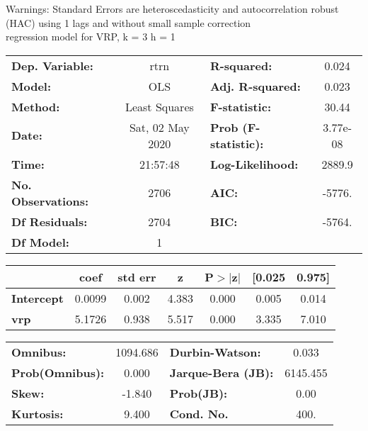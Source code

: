 Warnings: \newline
 [1] Standard Errors are heteroscedasticity and autocorrelation robust (HAC) using 1 lags and without small sample correction\\ 

regression model for VRP, k = 3 h = 1\begin{center}
\begin{tabular}{lclc}
\toprule
\textbf{Dep. Variable:}    &       rtrn       & \textbf{  R-squared:         } &     0.024   \\
\textbf{Model:}            &       OLS        & \textbf{  Adj. R-squared:    } &     0.023   \\
\textbf{Method:}           &  Least Squares   & \textbf{  F-statistic:       } &     30.44   \\
\textbf{Date:}             & Sat, 02 May 2020 & \textbf{  Prob (F-statistic):} &  3.77e-08   \\
\textbf{Time:}             &     21:57:48     & \textbf{  Log-Likelihood:    } &    2889.9   \\
\textbf{No. Observations:} &        2706      & \textbf{  AIC:               } &    -5776.   \\
\textbf{Df Residuals:}     &        2704      & \textbf{  BIC:               } &    -5764.   \\
\textbf{Df Model:}         &           1      & \textbf{                     } &             \\
\bottomrule
\end{tabular}
\begin{tabular}{lcccccc}
                   & \textbf{coef} & \textbf{std err} & \textbf{z} & \textbf{P$> |$z$|$} & \textbf{[0.025} & \textbf{0.975]}  \\
\midrule
\textbf{Intercept} &       0.0099  &        0.002     &     4.383  &         0.000        &        0.005    &        0.014     \\
\textbf{vrp}       &       5.1726  &        0.938     &     5.517  &         0.000        &        3.335    &        7.010     \\
\bottomrule
\end{tabular}
\begin{tabular}{lclc}
\textbf{Omnibus:}       & 1094.686 & \textbf{  Durbin-Watson:     } &    0.033  \\
\textbf{Prob(Omnibus):} &   0.000  & \textbf{  Jarque-Bera (JB):  } & 6145.455  \\
\textbf{Skew:}          &  -1.840  & \textbf{  Prob(JB):          } &     0.00  \\
\textbf{Kurtosis:}      &   9.400  & \textbf{  Cond. No.          } &     400.  \\
\bottomrule
\end{tabular}
\end{center}

